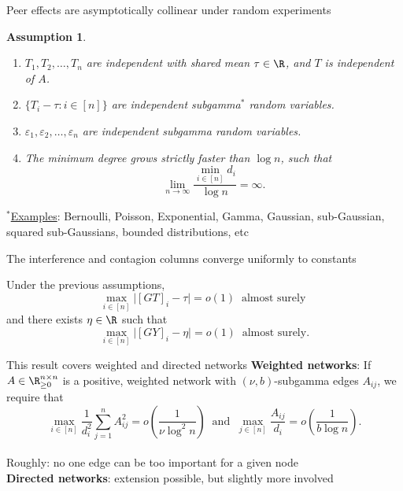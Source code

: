 \documentclass[aspectratio=169]{beamer}
\newtheorem{assumption}{Assumption}
\theoremstyle{remark}
\begin{document}
\begin{frame}{Peer effects are asymptotically collinear under random experiments}
    \begin{assumption}
        \begin{enumerate}
            \item $T_1,T_2,\dots,T_n$ are independent with shared mean $\tau \in \R$, and $T$ is independent of $A$.
            \item $\{ T_i - \tau : i \in [n] \}$ are independent subgamma$^*$ random variables.
            \item $\varepsilon_1, \varepsilon_2, \dots, \varepsilon_n$ are independent subgamma random variables.
            \item The minimum degree grows strictly faster than $\log n$, such that
                  \begin{equation*}
                      \lim_{n \to \infty} \frac{\min_{i \in [n]} d_i}{\log n} = \infty.
                  \end{equation*}
        \end{enumerate}
    \end{assumption}
    
    $^*$\underline{Examples}: Bernoulli, Poisson, Exponential, Gamma, Gaussian, sub-Gaussian, squared sub-Gaussians, bounded distributions, etc
\end{frame}

\begin{frame}{The interference and contagion columns converge uniformly to constants}
    
    \begin{theorem}
        Under the previous assumptions,
        \begin{equation*}
            \max_{i \in [n]} \Big| [GT]_i - \tau \Big|
            = o(1) ~ \text{ almost surely }
        \end{equation*}
        and there exists $\eta \in \R$ such that
        \begin{equation*}
            \max_{i \in [n]} \Big| [GY]_i - \eta \Big|
            = o(1) ~ \text{ almost surely.}
        \end{equation*}
    \end{theorem}
\end{frame}

\begin{frame}{This result covers weighted and directed networks}
    \textbf{Weighted networks}: If $A \in \R^{n \times n}_{\ge 0}$ is a positive, weighted network with $(\nu, b)$-subgamma edges $A_{ij}$, we require that
    \begin{equation*}
        \max_{i \in [n]} \frac{1}{d_i^2} \sum_{j=1}^n A_{ij}^2
        = o\left( \frac{ 1 }{ \nu \log^2 n } \right)
        ~\text{ and }~
        \max_{j \in [n]} \frac{ A_{ij} }{ d_i }
        = o\left( \frac{ 1 }{ b \log n } \right).
    \end{equation*} \\
    Roughly: no one edge can be too important for a given node \\
    \vspace{4mm}
    \textbf{Directed networks}: extension possible, but slightly more involved
\end{frame}
\end{document}
